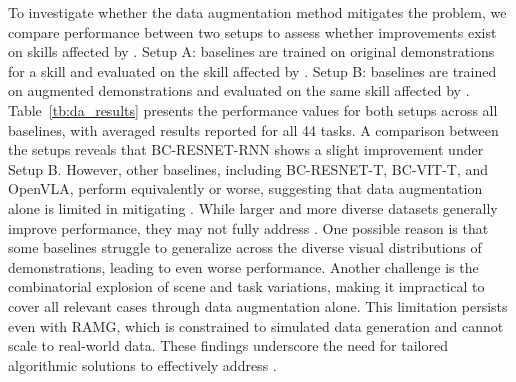 To investigate whether the data augmentation method mitigates the \pb problem, we compare performance between two setups to assess whether improvements exist on skills affected by \pb. Setup A: baselines are trained on original demonstrations for a skill and evaluated on the skill affected by \pb. Setup B: baselines are trained on augmented demonstrations and evaluated on the same skill affected by \pb. Table~\ref{tb:da_results} presents the performance values for both setups across all baselines, with averaged results reported for all 44 tasks. A comparison between the setups reveals that BC-RESNET-RNN shows a slight improvement under Setup B. However, other baselines, including BC-RESNET-T, BC-VIT-T, and OpenVLA, perform equivalently or worse, suggesting that data augmentation alone is limited in mitigating \pb. While larger and more diverse datasets generally improve performance, they may not fully address \pb. One possible reason is that some baselines struggle to generalize across the diverse visual distributions of demonstrations, leading to even worse performance. Another challenge is the combinatorial explosion of scene and task variations, making it impractical to cover all relevant cases through data augmentation alone. This limitation persists even with RAMG, which is constrained to simulated data generation and cannot scale to real-world data. These findings underscore the need for tailored algorithmic solutions to effectively address \pb.


